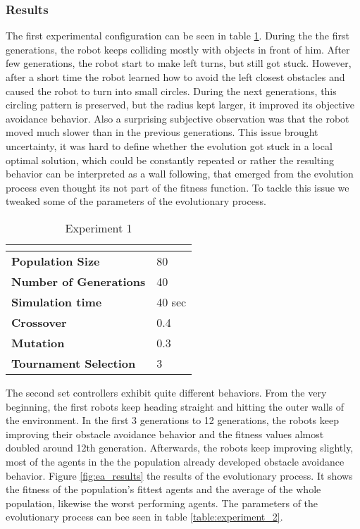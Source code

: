 \documentclass[format=acmsmall, review=false, screen=true]{acmart}
\begin{document}
\subsubsection{Results}

The first experimental configuration can be seen in table \ref{fig:experiment_1}. During the the first generations, the robot keeps colliding mostly with objects in front of him. After few generations, the robot start to make left turns, but still got stuck. However, after a short time the robot learned how to avoid the left closest obstacles and caused the robot to turn into small circles. During the next generations, this circling pattern is preserved, but the radius kept larger, it improved its objective avoidance behavior. Also a surprising  subjective observation was that the robot moved much slower than in the previous generations. This issue brought uncertainty, it was hard to define whether the evolution got stuck in a local optimal solution, which could be constantly repeated or rather the resulting behavior can be interpreted as a wall following, that emerged from the evolution process even thought its not part of the fitness function. To tackle this issue we tweaked some of the parameters of the evolutionary process.

\begin{table}[H]
\begin{tabular}{ll}
\hline
\textbf{}                      & \textbf{} \\ \hline
\textbf{Population Size}       & 80        \\
\textbf{Number of Generations} & 40        \\
\textbf{Simulation time}       & 40 sec    \\
\textbf{Crossover}             & 0.4       \\
\textbf{Mutation}              & 0.3       \\
\textbf{Tournament Selection}  & 3        
\end{tabular}
\caption{Experiment 1}
\label{fig:experiment_1}
\end{table}


The second set controllers exhibit quite different behaviors. From the very beginning, the first robots keep heading straight and hitting the outer walls of the environment. In the first 3 generations to 12 generations, the robots keep improving their obstacle avoidance behavior and the fitness values almost doubled around 12th generation. Afterwards, the robots keep improving slightly, most of the agents in the the population already developed obstacle avoidance behavior. Figure \ref{fig:ea_results} the results of the evolutionary process. It shows the fitness of the population's fittest agents and the average of the whole population, likewise the worst performing agents. The parameters of the evolutionary process can bee seen in table \ref{table:experiment_2}.
\end{document}
